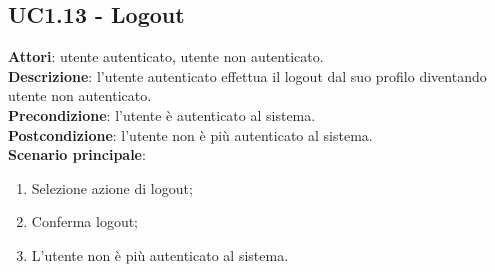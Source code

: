 \subsection{UC1.13 - Logout}{
	\label{uc1.13}
	\textbf{Attori}: utente autenticato, utente non autenticato.\\
	\textbf{Descrizione}: l'utente autenticato effettua il logout dal suo profilo diventando utente non autenticato.\\
	\textbf{Precondizione}: l'utente è autenticato al sistema.\\
	\textbf{Postcondizione}: l'utente non è più autenticato al sistema.\\
	\textbf{Scenario principale}:
	\begin{enumerate}
		\item Selezione azione di logout;
		\item Conferma logout;
		\item L'utente non è più autenticato al sistema.
	\end{enumerate}
}